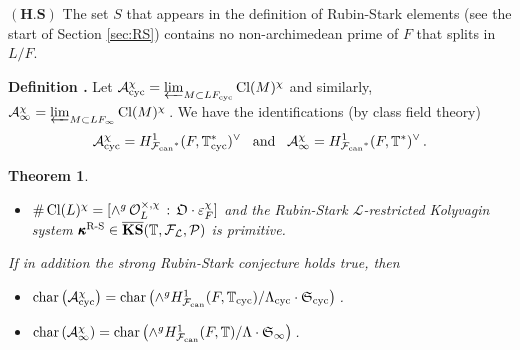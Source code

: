 \documentclass[12pt]{amsart}
\numberwithin{equation}{section}
\newtheorem{thm}{Theorem}[section]
\newenvironment{define}{\par\medskip\noindent\refstepcounter{thm}
\bgroup{\hspace*{-0.15 cm}\bf{Definition}
\thethm.}\bgroup}{\egroup \egroup\par\medskip}
\begin{document}
$(\textbf{H.S})$ The set $S$ that appears in the definition of Rubin-Stark elements (see the start of Section \ref{sec:RS}) contains no non-archimedean prime of $F$ that splits in $L/F$.
\begin{define}
\label{def:limitofidealclassgroups}
Let $\mathcal{A}_{\textup{cyc}}^\chi=\varprojlim_{M\subset LF_{\textup{cyc}}} \textup{Cl}(M)^\chi$ and similarly, $\mathcal{A}_\infty^\chi=\varprojlim_{M\subset LF_\infty} \textup{Cl}(M)^\chi$\,. We have the identifications (by class field theory) 
$$\mathcal{A}_{\textup{cyc}}^\chi=H^1_{{\mathcal{F}_{\textup{\lowercase{can}}}}^*}(F,{\mathbb{T}}_{\textup{cyc}}^*)^\vee \hbox{\,\,\,\ and \,\,\,} \mathcal{A}_\infty^\chi=H^1_{{\mathcal{F}_{\textup{\lowercase{can}}}}^*}(F,{\mathbb{T}}^*)^\vee\,.$$
\end{define}
\begin{thm}$\,$
\label{thm:gras1}
\begin{itemize}
\item[(i)] $\#\, \textup{Cl}(L)^\chi = [\wedge^g\, \mathcal{O}_{L}^{\times,\chi}\,:\,\frak{O}\cdot \varepsilon_{F}^\chi]$ and the Rubin-Stark ${\mathcal{L}}$-restricted Kolyvagin system $\pmb{\kappa}^{\textup{R-S}} \in \overline{\textbf{\textup{KS}}}({\mathbb{T}},{\mathcal{F}}_{\mathcal{L}},{\mathcal{P}})$ is primitive.
\end{itemize}
If in addition the strong Rubin-Stark conjecture holds true, then
\begin{itemize}
\item[(ii)] $\textup{char}\left(\mathcal{A}_{\textup{cyc}}^\chi\right)=\textup{char}\left(\wedge^g H^1_{\mathcal{F}_{\textup{\lowercase{can}}}}(F,{\mathbb{T}}_{\textup{cyc}})/{\Lambda}_{\textup{cyc}}\cdot \frak{S}_{\textup{cyc}}\right)$\,.
\item[(iii)] $\textup{char}\left(\mathcal{A}_\infty^\chi\right)=\textup{char}\left(\wedge^g H^1_{\mathcal{F}_{\textup{\lowercase{can}}}}(F,{\mathbb{T}})/{\Lambda}\cdot \frak{S}_\infty\right)$\,.
\end{itemize}
\end{thm}
\end{document}
